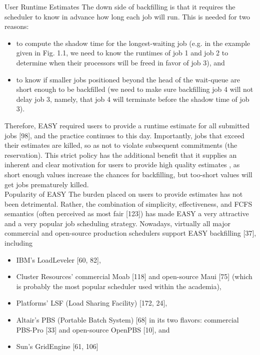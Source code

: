 User Runtime Estimates The down side of backfilling is that it requires the scheduler to know in advance how long each job will run. This is needed for two reasons:
\begin{itemize}
\item to compute the shadow time for the longest-waiting job (e.g. in the example given in Fig. 1.1, we need to know the runtimes of job 1 and job 2 to determine when their processors will be freed in favor of job 3), and
\item to know if smaller jobs positioned beyond the head of the wait-queue are short enough to be backfilled (we need to make sure backfilling job 4 will not delay job 3, namely, that job 4 will terminate before the shadow time of job 3).
\end{itemize}
Therefore, EASY required users to provide a runtime estimate for all submitted jobs [98], and the practice continues to this day. Importantly, jobs that exceed their estimates are killed, so as not to violate subsequent commitments (the reservation). This strict policy has the additional benefit that it supplies an inherent and clear motivation for users to provide high quality estimates , as short enough values increase the chances for backfilling, but too-short values will get jobs prematurely killed.\\

Popularity of EASY The burden placed on users to provide estimates has not been detrimental. Rather, the combination of simplicity, effectiveness, and FCFS semantics (often perceived as most fair [123]) has made EASY a very attractive and a very popular job scheduling strategy. Nowadays, virtually all major commercial and open-source production schedulers support EASY backfilling [37], including
\begin{itemize}
\item IBM’s LoadLeveler [60, 82],
\item Cluster Resources’ commercial Moab [118] and open-source Maui [75] (which is probably the most popular scheduler used within the academia),
\item Platforms’ LSF (Load Sharing Facility) [172, 24],
\item Altair’s PBS (Portable Batch System) [68] in its two flavors: commercial PBS-Pro [33] and open-source OpenPBS [10], and
\item Sun’s GridEngine [61, 106]
\end{itemize}

